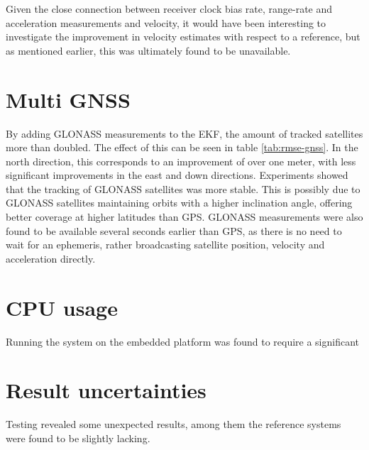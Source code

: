     Given the close connection between receiver clock bias rate, range-rate and acceleration measurements and velocity, it would have been interesting to investigate the improvement in velocity estimates with respect to a reference, but as mentioned earlier, this was ultimately found to be unavailable.
    
        
\section{Multi GNSS}
        
    By adding GLONASS measurements to the EKF, the amount of tracked satellites more than doubled. The effect of this can be seen in table \ref{tab:rmse-gnss}. In the north direction, this corresponds to an improvement of over one meter, with less significant improvements in the east and down directions. Experiments showed that the tracking of GLONASS satellites was more stable. This is possibly due to GLONASS satellites maintaining orbits with a higher inclination angle, offering better coverage at higher latitudes than GPS. GLONASS measurements were also found to be available several seconds earlier than GPS, as there is no need to wait for an ephemeris, rather broadcasting satellite position, velocity and acceleration directly. 
        
\section{CPU usage}
    Running the system on the embedded platform was found to require a significant 

    
\section{Result uncertainties}
    Testing revealed some unexpected results, among them the reference systems were found to be slightly lacking.

